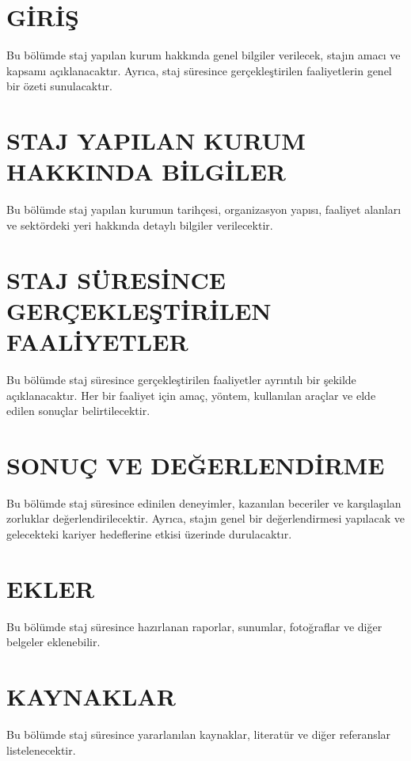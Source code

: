 \section{GİRİŞ}
Bu bölümde staj yapılan kurum hakkında genel bilgiler verilecek, stajın amacı ve kapsamı açıklanacaktır. Ayrıca, staj süresince gerçekleştirilen faaliyetlerin genel bir özeti sunulacaktır.
\newpage
\section{STAJ YAPILAN KURUM HAKKINDA BİLGİLER}
Bu bölümde staj yapılan kurumun tarihçesi, organizasyon yapısı, faaliyet alanları ve sektördeki yeri hakkında detaylı bilgiler verilecektir.
\newpage
\section{STAJ SÜRESİNCE GERÇEKLEŞTİRİLEN FAALİYETLER}
Bu bölümde staj süresince gerçekleştirilen faaliyetler ayrıntılı bir şekilde açıklanacaktır. Her bir faaliyet için amaç, yöntem, kullanılan araçlar ve elde edilen sonuçlar belirtilecektir.
\newpage
\section{SONUÇ VE DEĞERLENDİRME}
Bu bölümde staj süresince edinilen deneyimler, kazanılan beceriler ve karşılaşılan zorluklar değerlendirilecektir. Ayrıca, stajın genel bir değerlendirmesi yapılacak ve gelecekteki kariyer hedeflerine etkisi üzerinde durulacaktır.
\newpage
\section{EKLER}
Bu bölümde staj süresince hazırlanan raporlar, sunumlar, fotoğraflar ve diğer belgeler eklenebilir.
\newpage
\section{KAYNAKLAR}
Bu bölümde staj süresince yararlanılan kaynaklar, literatür ve diğer referanslar listelenecektir.